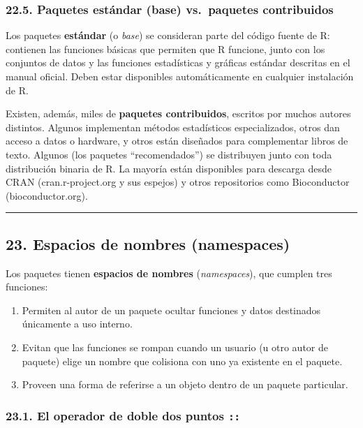 \documentclass[
  jou,
  floatsintext,
  longtable,
  a4paper,
  nolmodern,
  notxfonts,
  notimes,
  12pt,
  colorlinks=true,linkcolor=blue,citecolor=blue,urlcolor=blue]{apa7}
\providecommand{\tightlist}{%
  \setlength{\itemsep}{0pt}\setlength{\parskip}{0pt}}
\begin{document}
\subsubsection{22.5. Paquetes estándar (base) vs.~paquetes
contribuidos}\label{paquetes-estuxe1ndar-base-vs.-paquetes-contribuidos}

Los paquetes \textbf{estándar} (o \emph{base}) se consideran parte del
código fuente de R: contienen las funciones básicas que permiten que R
funcione, junto con los conjuntos de datos y las funciones estadísticas
y gráficas estándar descritas en el manual oficial. Deben estar
disponibles automáticamente en cualquier instalación de R.

Existen, además, miles de \textbf{paquetes contribuidos}, escritos por
muchos autores distintos. Algunos implementan métodos estadísticos
especializados, otros dan acceso a datos o hardware, y otros están
diseñados para complementar libros de texto. Algunos (los paquetes
``recomendados'') se distribuyen junto con toda distribución binaria de
R. La mayoría están disponibles para descarga desde CRAN
(cran.r-project.org y sus espejos) y otros repositorios como
Bioconductor (bioconductor.org).

\begin{center}\rule{0.5\linewidth}{0.5pt}\end{center}

\subsection{23. Espacios de nombres
(namespaces)}\label{espacios-de-nombres-namespaces}

Los paquetes tienen \textbf{espacios de nombres} (\emph{namespaces}),
que cumplen tres funciones:

\begin{enumerate}
\def\labelenumi{\arabic{enumi}.}
\tightlist
\item
  Permiten al autor de un paquete ocultar funciones y datos destinados
  únicamente a uso interno.
\item
  Evitan que las funciones se rompan cuando un usuario (u otro autor de
  paquete) elige un nombre que colisiona con uno ya existente en el
  paquete.
\item
  Proveen una forma de referirse a un objeto dentro de un paquete
  particular.
\end{enumerate}

\subsubsection{\texorpdfstring{23.1. El operador de doble dos puntos
\texttt{::}}{23.1. El operador de doble dos puntos ::}}\label{el-operador-de-doble-dos-puntos}
\end{document}

